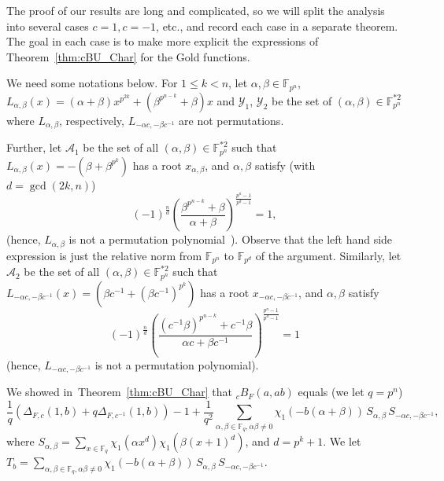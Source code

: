 \documentclass[11pt]{article}
\def\F{{\mathbb F}}
\newcommand{\sA}{\mathscr{A}}
\newcommand{\sY}{\mathscr{Y}}
\begin{document}
The proof of our results are long and complicated, so we will split the analysis into several cases $c=1,c=-1$, etc., and record each case in a separate theorem. The goal in each case is to make more explicit the expressions of Theorem~\ref{thm:cBU_Char} for the Gold functions.

We  need some notations below.  For $1\leq k<n$, let $\alpha,\beta\in\F_{p^n}$, $L_{\alpha,\beta}(x)=(\alpha+\beta)x^{p^{2k}}+(\beta^{p^{n-k}}+\beta)x$ and $\sY_1$, $\sY_2$ be the set of $(\alpha,\beta)\in\F_{p^n}^{*2}$ where $L_{\alpha,\beta}$, respectively,   $L_{-\alpha c,-\beta c^{-1}}$   are not permutations.

Further, let $\mathscr{A}_1$ be the set of all $(\alpha,\beta)\in\F_{p^n}^{*2}$ such that $L_{\alpha,\beta}(x)=-(\beta+\beta^{p^k})$ has a root $x_{\alpha,\beta}$,  and
$\alpha,\beta$ satisfy (with $d=\gcd(2k,n)$)
\[
(-1)^{\frac{n}{d}}\left(\frac{\beta^{p^{n-k}}+\beta}{\alpha+\beta} \right)^{\frac{p^n-1}{p^d-1}}=1,
\]
(hence, $L_{\alpha,\beta}$ is not a permutation polynomial~\cite{ZWW20}). Observe that the left hand side expression is just the relative norm from $\F_{p^n}$ to $\F_{p^d}$ of the argument.
Similarly, let $\sA_2$ be the set of all $(\alpha,\beta)\in\F_{p^n}^{*2}$ such that $L_{-\alpha c,-\beta c^{-1}}(x)=(\beta c^{-1}+(\beta c^{-1})^{p^k})$ has a root $x_{-\alpha c,-\beta c^{-1}}$,  and
$\alpha,\beta$ satisfy  
\[
(-1)^{\frac{n}{d}}\left(\frac{(c^{-1}\beta)^{p^{n-k}}+c^{-1}\beta}{\alpha c+\beta c^{-1}} \right)^{\frac{p^n-1}{p^d-1}}=1
\]
(hence, $L_{-\alpha c,-\beta c^{-1}} $ is not a permutation polynomial).


We showed in~Theorem~\ref{thm:cBU_Char} that ${_c}B_F(a,ab)$ equals (we let $q=p^n$)
\begin{equation}
\label{eq:eq32}
\frac{1}{q}\left(\Delta_{F,c}(1,b)+q\Delta_{F,c^{-1}}(1,b)\right)-1 +\frac1{q^2}\sum_{\alpha,\beta\in\F_q,\alpha\beta\neq 0} \chi_1(-b(\alpha+\beta))\, S_{\alpha,\beta}\, S_{-\alpha c,-\beta c^{-1}},
\end{equation}
where
$
S_{\alpha,\beta}=\sum_{x\in \F_q} \chi_1\left(\alpha x^d\right)\chi_1\left(\beta(x+1)^d\right)$, and $d=p^k+1$. We let $\displaystyle T_b=\sum_{\alpha,\beta\in\F_q,\alpha\beta\neq 0} \chi_1(-b(\alpha+\beta))\, S_{\alpha,\beta}\, S_{-\alpha c,-\beta c^{-1}}$.
\end{document}
